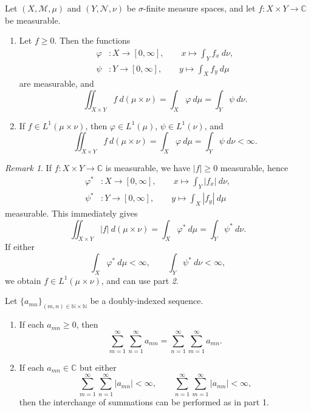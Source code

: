 \documentclass[11pt]{article}
\newcommand{\C}{\mathbb{C}}
\newcommand{\N}{\mathbb{N}}
\newcommand{\M}{\mathcal{M}}
\newcommand{\MN}{\mathcal{N}}
\theoremstyle{definition}
\theoremstyle{remark}
\newtheorem*{remark}{Remark}
\numberwithin{equation}{section}
\begin{document}
    \begin{theorem}
        Let $(X, \M, \mu)$ and $(Y, \MN, \nu)$ be $\sigma$-finite measure spaces, and
        let $f\colon X\times Y \to \C$ be measurable.
        \begin{enumerate}
            \item Let $f\geq 0$. Then the functions \begin{align*}
                \varphi&\colon X \to [0, \infty], \qquad x \mapsto \int_Y f_x\:d\nu,
                \\
                \psi&\colon Y \to [0, \infty], \qquad y \mapsto \int_X f_y\:d\mu
            \end{align*}
            are measurable, and \[
                \iint_{X\times Y} f\:d(\mu\times \nu) = \int_X \varphi\:d\mu = \int_Y
                \psi\:d\nu.
            \]

            \item If $f \in L^1(\mu\times \nu)$, then $\varphi \in L^1(\mu)$, $\psi
            \in L^1(\nu)$, and \[
                \iint_{X\times Y} f\:d(\mu\times \nu) = \int_X \varphi\:d\mu = \int_Y
                \psi\:d\nu < \infty.
            \]
        \end{enumerate}

        \begin{remark}
            If $f\colon X \times Y \to \C$ is measurable, we have $|f| \geq 0$
            measurable, hence \begin{align*}
                \varphi^*&\colon X \to [0, \infty], \qquad x \mapsto \int_Y |f_x|\:d\nu,
                \\
                \psi^*&\colon Y \to [0, \infty], \qquad y \mapsto \int_X |f_y|\:d\mu
            \end{align*}
            measurable. This immediately gives \[
                \iint_{X \times Y} |f|\:d(\mu\times\nu) = \int_X \varphi^*\:d\mu =
                \int_Y \psi^*\:d\nu.
            \] If either \[
                \int_X \varphi^*\:d\mu < \infty, \qquad
                \int_Y \psi^*\:d\nu < \infty,
            \] we obtain $f \in L^1(\mu\times\nu)$, and can use part \emph{2}.
        \end{remark}
    \end{theorem}

    \begin{corollary}
        Let $\{a_{mn}\}_{(m, n) \in \N\times\N}$ be a doubly-indexed sequence.
        \begin{enumerate}
            \item If each $a_{mn} \geq 0$, then \[
                 \sum_{m = 1}^\infty \sum_{n = 1}^\infty a_{mn} = \sum_{n = 1}^\infty
                 \sum_{m = 1}^\infty a_{mn}.
            \]
            \item If each $a_{mn} \in \C$ but either \[
                \sum_{m = 1}^\infty \sum_{n = 1}^\infty |a_{mn}| < \infty, \qquad
                \sum_{n = 1}^\infty \sum_{m = 1}^\infty |a_{mn}| < \infty,
            \] then the interchange of summations can be performed as in part 1.
        \end{enumerate}
    \end{corollary}
\end{document}
